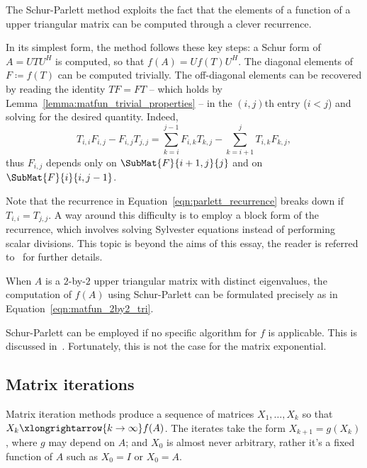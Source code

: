 The Schur-Parlett method exploits the fact that the elements of a function of a upper triangular matrix can be computed through a clever recurrence.

In its simplest form, the method follows these key steps: a Schur form of $A=UTU^{H}$ is computed, so that $f(A)=Uf(T)U^{H}$. The diagonal elements of $F\coloneqq f(T)$ can be computed trivially. The off-diagonal elements can be recovered by reading the identity $TF=FT$ -- which holds by Lemma~\ref{lemma:matfun_trivial_properties} -- in the $(i,j)$th entry ($i<j$) and solving for the desired quantity. Indeed, 
\begin{equation}\label{eqn:parlett_recurrence}
	T_{i,i}F_{i,j}-F_{i,j}T_{j,j} = \sum_{k=i}^{j-1}F_{i,k}T_{k,j} - \sum_{k=i+1}^jT_{i,k}F_{k,j},
\end{equation}
thus $F_{i,j}$ depends only on $\SubMat{F}{i+1,j}{j}$ and on $\SubMat{F}{i}{i,j-1}$.  

\begin{oss*}
	Note that the recurrence in Equation~\eqref{eqn:parlett_recurrence} breaks down if $T_{i,i}=T_{j,j}$. A way around this difficulty is to employ a block form of the recurrence, which involves solving Sylvester equations instead of performing scalar divisions. This topic is beyond the aims of this essay, the reader is referred to~\cite[§~4.6]{higham:matfun_book} for further details. 
\end{oss*}

\begin{oss*}
	When $A$ is a $2$-by-$2$ upper triangular matrix with distinct eigenvalues, the computation of $f(A)$ using Schur-Parlett can be formulated precisely as in Equation~\eqref{eqn:matfun_2by2_tri}.	
\end{oss*}

Schur-Parlett can be employed if no specific algorithm for $f$ is applicable. This is discussed in~\cite[§~9]{higham:matfun_book}. Fortunately, this is not the case for the matrix exponential.

\subsection{Matrix iterations}
Matrix iteration methods produce a sequence of matrices $X_1,\dots,X_k$ so that $X_k\xlongrightarrow{k\to\infty}f(A)$. The iterates take the form $X_{k+1}=g(X_k)$, where $g$ may depend on $A$; and $X_0$ is almost never arbitrary, rather it's a fixed function of $A$ such as $X_0=I$ or $X_0=A$.

